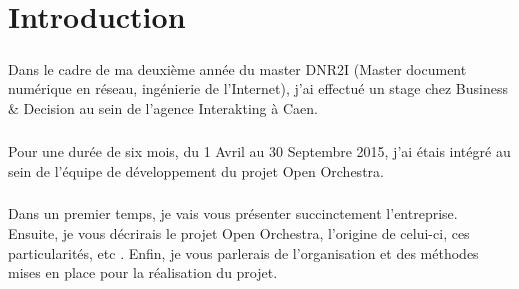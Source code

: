 \chapter*{Introduction}
        \paragraph{}
         Dans le cadre de ma deuxième année du master DNR2I (Master document numérique en réseau, ingénierie de l'Internet), j'ai effectué un stage chez Business \& Decision au sein de l'agence Interakting à Caen.
         \paragraph{}
          Pour une durée de six mois, du 1 Avril au 30 Septembre 2015, j'ai étais intégré au sein de l'équipe de développement du projet Open Orchestra.
         \paragraph{}
         Dans un premier temps, je vais vous présenter succinctement l'entreprise. Ensuite, je vous décrirais le projet Open Orchestra, l'origine de celui-ci, ces particularités, etc . Enfin, je vous parlerais de l'organisation et des méthodes mises en place pour la réalisation du projet.
